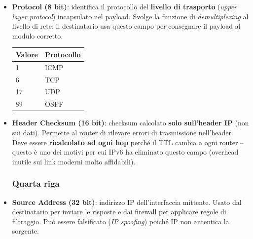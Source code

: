 \documentclass[a4paper,12pt]{report}
\begin{document}
\begin{itemize}
          Scopo: prevenire che datagrammi ``vaganti'' per
          loop di routing circolino indefinitamente occupando banda.
          Il valore iniziale tipico è 64 (Linux) o 128 (Windows).
          Il comando \texttt{traceroute} sfrutta deliberatamente
          questo meccanismo: invia datagrammi con TTL = 1, 2, 3,
          \ldots\ e raccoglie i messaggi ICMP per ricostruire il
          percorso.

    \item \textbf{Protocol (8 bit)}: identifica il protocollo del
          \textbf{livello di trasporto} (\textit{upper layer protocol})
          incapsulato nel payload. Svolge la funzione di
          \textit{demultiplexing} al livello di rete: il destinatario
          usa questo campo per consegnare il payload al modulo
          corretto.
          \begin{center}
          \begin{tabular}{ll}
          \toprule
          \textbf{Valore} & \textbf{Protocollo} \\
          \midrule
          1  & ICMP \\
          6  & TCP  \\
          17 & UDP  \\
          89 & OSPF \\
          \bottomrule
          \end{tabular}
          \end{center}

    \item \textbf{Header Checksum (16 bit)}: checksum calcolato
          \textbf{solo sull'header IP} (non sui dati). Permette al
          router di rilevare errori di trasmissione nell'header.
          Deve essere \textbf{ricalcolato ad ogni hop} perché il TTL
          cambia a ogni router -- questo è uno dei motivi per cui
          IPv6 ha eliminato questo campo (overhead inutile sui link
          moderni molto affidabili).

\vspace{0.5cm}
\subsubsection*{Quarta riga}
    \item \textbf{Source Address (32 bit)}: indirizzo IP
          dell'interfaccia mittente. Usato dal destinatario per
          inviare le risposte e dai firewall per applicare regole di
          filtraggio. Può essere falsificato (\textit{IP spoofing})
          poiché IP non autentica la sorgente.


\end{itemize}
\end{document}
